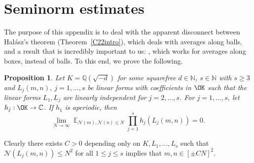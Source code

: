 \documentclass[11pt]{amsart}
\newtheorem{proposition}[lemma]{Proposition}
\theoremstyle{definition}
\DeclareMathOperator*{\E}{\mathbb{E}}
\newcommand{\C}{{\mathbb C}}
\newcommand{\N}{{\mathbb N}}
\newcommand{\NN}{{\mathcal N}}
\newcommand{\Q}{{\mathbb Q}}
\newcommand{\nnorm}[1]{\left|\!\left|\!\left| #1\right|\!\right|\!\right|}
\begin{document}
\section{Seminorm estimates}\label{appapp}
The purpose of this appendix is to deal with the apparent disconnect between Halász's theorem (Theorem~\ref{C22intro}), which deals with averages along balls, and a result that is incredibly important to us: \cite[Theorem~1.12]{S23}, which works for averages along boxes, instead of balls.
%
%
%
To this end, we prove the following.
\begin{proposition}\label{P: appendix}
Let $K=\Q(\sqrt{-d})$ for some squarefree $d\in\N$, $s \in \N$ with $s \geq 3$ and $L_j(m,n)$, $j=1,\dots, s$ be linear forms with coefficients in $\OK$ such that the linear forms $L_1, L_j$ are linearly independent for $j=2,\dots, s$. For $j=1,\dots, s$, let $h_j: \OK \to \C$. If  $h_{1}$ is aperiodic, 
then
\begin{equation}\nonumber%
   \lim_{N \to \infty} \E_{\NN(m),\NN(n) \leq  N} \prod_{j=1}^s h_j(L_j(m,n))  = 0.
\end{equation}
 \end{proposition}
\iffalse
Clearly there exists $C>0$ depending only on $K,L_{1},\dots,L_{s}$ such that $\NN(L_{j}(m,n)) \leq  N^{2}$ for all $1\leq j\leq s$ implies that $m,n\in[\pm CN]^{2}$.%
\end{document}
